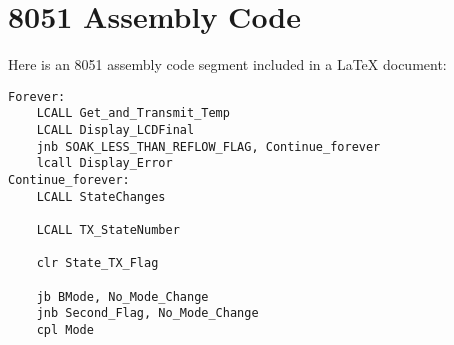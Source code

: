 \documentclass{article}
\begin{document}
\section{8051 Assembly Code}

Here is an 8051 assembly code segment included in a LaTeX document:

\begin{lstlisting}[language={[x86masm]Assembler}]
Forever:
    LCALL Get_and_Transmit_Temp
    LCALL Display_LCDFinal
    jnb SOAK_LESS_THAN_REFLOW_FLAG, Continue_forever
    lcall Display_Error
Continue_forever:
    LCALL StateChanges

    LCALL TX_StateNumber

    clr State_TX_Flag

    jb BMode, No_Mode_Change
    jnb Second_Flag, No_Mode_Change
    cpl Mode
\end{lstlisting}
\end{document}
